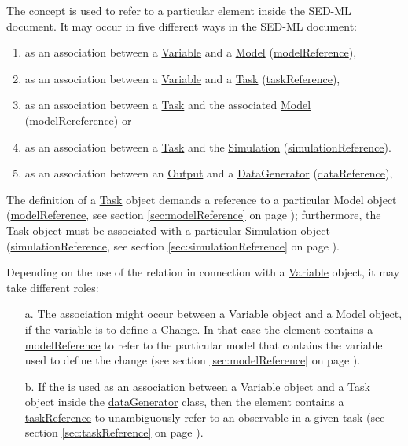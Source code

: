 \label{sec:reference}

The  concept is used to refer to a particular element inside the SED-ML document. It may occur in five different ways in the SED-ML document:
%
\begin{enumerate}
\item{as an association between a \hyperref[class:variable]{Variable} and a \hyperref[class:model]{Model} (\hyperref[sec:modelReference]{modelReference}),}
\item{as an association between a \hyperref[class:variable]{Variable} and a \hyperref[class:task]{Task} (\hyperref[sec:taskReference]{taskReference}),}
\item{as an association between a \hyperref[class:task]{Task} and the associated \hyperref[class:model]{Model} (\hyperref[sec:modelReference]{modelRereference}) or}
\item{as an association between a \hyperref[class:task]{Task} and the \hyperref[class:simulation]{Simulation} (\hyperref[sec:simulationReference]{simulationReference}).}
\item{as an association between an \hyperref[class:output]{Output} and a \hyperref[class:dataGenerator]{DataGenerator} (\hyperref[sec:dataReference]{dataReference}),}
\end{enumerate}
%
The definition of a \hyperref[class:task]{Task} object demands a reference to a particular Model object (\hyperref[sec:modelReference]{modelReference}, see section \ref{sec:modelReference} on page \pageref{sec:modelReference}); furthermore, the Task object must be associated with a particular Simulation object (\hyperref[sec:simulationReference]{simulationReference}, see section \ref{sec:simulationReference} on page \pageref{sec:simulationReference}).

Depending on the use of the  relation in connection with a \hyperref[class:variable]{Variable} object, it may take different roles: 
\begin{enumerate}
\item[a.]{The  association might occur between a Variable object and a Model object, if the variable is to define a \hyperref[class:change]{Change}. 
In that case the  element contains a \hyperref[sec:modelReference]{modelReference} to refer to the particular model that contains the variable used to define the change (see section \ref{sec:modelReference} on page \pageref{sec:modelReference}). }
\item[b.]{If the  is used as an association between a Variable object and a Task object  inside the \hyperref[class:dataGenerator]{dataGenerator} class, then the  element contains a \hyperref[sec:taskReference]{taskReference} to unambiguously refer to an observable in a given task (see section \ref{sec:taskReference} on page \pageref{sec:taskReference}).}
\end{enumerate}

